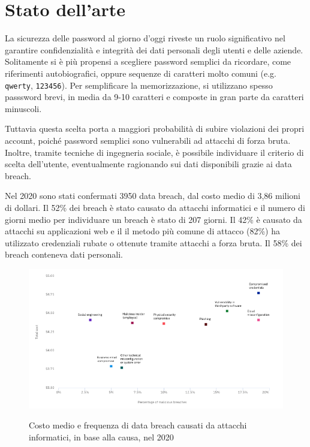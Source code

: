 \chapter{Stato dell'arte}
\label{ch:state of the art}

La sicurezza delle password al giorno d'oggi riveste un ruolo significativo nel garantire confidenzialità e integrità dei dati personali degli utenti e delle aziende. 
Solitamente si è più propensi a scegliere password semplici da ricordare, come riferimenti autobiografici, oppure sequenze di caratteri molto comuni (e.g. \texttt{qwerty}, \texttt{123456}).
Per semplificare la memorizzazione, si utilizzano spesso passsword brevi, in media da 9-10 caratteri e composte in gran parte da caratteri minuscoli. \cite{obspasshab}

Tuttavia questa scelta porta a maggiori probabilità di subire violazioni dei propri account, poiché password semplici sono vulnerabili ad attacchi di forza bruta. Inoltre, tramite tecniche di ingegneria sociale, è possibile individuare il criterio di scelta dell'utente, eventualmente ragionando sui dati disponibili grazie ai data breach.

Nel 2020 sono stati confermati 3950 data breach, dal costo medio di 3,86 milioni di dollari. Il 52\% dei breach è stato causato da attacchi informatici e il numero di giorni medio per individuare un breach è stato di 207 giorni. \cite{ibmcost}
Il 42\% è causato da attacchi su applicazioni web e il il metodo più comune di attacco (82\%) ha utilizzato credenziali rubate o ottenute tramite attacchi a forza bruta.
Il 58\% dei breach conteneva dati personali. \cite{verizon}
\begin{figure}[h]
    \centering
    \includegraphics[width=15cm]{./immagini/average_cost_and_frequency_data_breaches.png}
    \label{data breach}
    \caption{Costo medio e frequenza di data breach causati da attacchi informatici, in base alla causa, nel 2020}
\end{figure}

